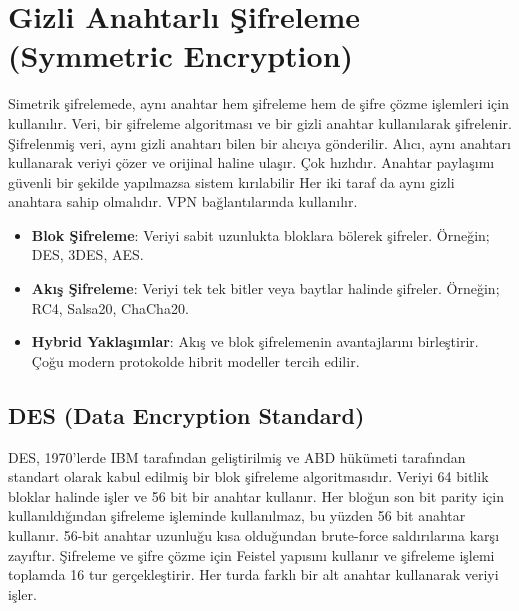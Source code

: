 \section{Gizli Anahtarlı Şifreleme (Symmetric Encryption)}

Simetrik şifrelemede, aynı anahtar hem şifreleme hem de şifre çözme işlemleri için kullanılır. Veri, bir şifreleme algoritması ve bir gizli anahtar kullanılarak şifrelenir. Şifrelenmiş veri, aynı gizli anahtarı bilen bir alıcıya gönderilir. Alıcı, aynı anahtarı kullanarak veriyi çözer ve orijinal haline ulaşır. Çok hızlıdır. Anahtar paylaşımı güvenli bir şekilde yapılmazsa sistem kırılabilir Her iki taraf da aynı gizli anahtara sahip olmalıdır. VPN bağlantılarında kullanılır. 

\begin{itemize}
    \item \textbf{Blok Şifreleme}: Veriyi sabit uzunlukta bloklara bölerek şifreler. Örneğin; DES, 3DES, AES.
    \item \textbf{Akış Şifreleme}: Veriyi tek tek bitler veya baytlar halinde şifreler. Örneğin; RC4, Salsa20, ChaCha20.
    \item \textbf{Hybrid Yaklaşımlar}: Akış ve blok şifrelemenin avantajlarını birleştirir. Çoğu modern protokolde hibrit modeller tercih edilir.
\end{itemize}

\subsection{DES (Data Encryption Standard)}

DES, 1970'lerde IBM tarafından geliştirilmiş ve ABD hükümeti tarafından standart olarak kabul edilmiş bir blok şifreleme algoritmasıdır. Veriyi 64 bitlik bloklar halinde işler ve 56 bit bir anahtar kullanır. Her bloğun son bit parity için kullanıldığından şifreleme işleminde kullanılmaz, bu yüzden 56 bit anahtar kullanır. 56-bit anahtar uzunluğu kısa olduğundan brute-force saldırılarına karşı zayıftır. Şifreleme ve şifre çözme için Feistel yapısını kullanır ve şifreleme işlemi toplamda 16 tur gerçekleştirir. Her turda farklı bir alt anahtar kullanarak veriyi işler. 

